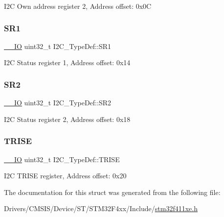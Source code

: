 I2C Own address register 2, Address offset\+: 0x0C \mbox{\label{struct_i2_c___type_def_a639be124227c03bb3f5fe0e7faf84995}} 
\subsubsection{\texorpdfstring{S\+R1}{SR1}}
{\footnotesize\ttfamily \hyperlink{core__sc300_8h_aec43007d9998a0a0e01faede4133d6be}{\+\_\+\+\_\+\+IO} uint32\+\_\+t I2\+C\+\_\+\+Type\+Def\+::\+S\+R1}

I2C Status register 1, Address offset\+: 0x14 \mbox{\label{struct_i2_c___type_def_ac509048af4b9ac67c808d584fdbc712e}} 
\subsubsection{\texorpdfstring{S\+R2}{SR2}}
{\footnotesize\ttfamily \hyperlink{core__sc300_8h_aec43007d9998a0a0e01faede4133d6be}{\+\_\+\+\_\+\+IO} uint32\+\_\+t I2\+C\+\_\+\+Type\+Def\+::\+S\+R2}

I2C Status register 2, Address offset\+: 0x18 \mbox{\label{struct_i2_c___type_def_a9f1a5aee4a26b2fb30e08f88586c436d}} 
\subsubsection{\texorpdfstring{T\+R\+I\+SE}{TRISE}}
{\footnotesize\ttfamily \hyperlink{core__sc300_8h_aec43007d9998a0a0e01faede4133d6be}{\+\_\+\+\_\+\+IO} uint32\+\_\+t I2\+C\+\_\+\+Type\+Def\+::\+T\+R\+I\+SE}

I2C T\+R\+I\+SE register, Address offset\+: 0x20 

The documentation for this struct was generated from the following file\+:\begin{DoxyCompactItemize}
\item 
Drivers/\+C\+M\+S\+I\+S/\+Device/\+S\+T/\+S\+T\+M32\+F4xx/\+Include/\hyperlink{stm32f411xe_8h}{stm32f411xe.\+h}\end{DoxyCompactItemize}
